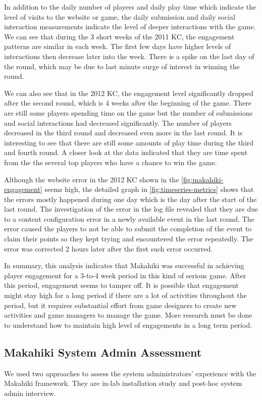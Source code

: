 In addition to the daily number of players and daily play time which indicate the level of visits to the website or game, the daily submission and daily social interaction measurements indicate the level of deeper interactions with the game. We can see that during the 3 short weeks of the 2011 KC, the engagement patterns are similar in each week. The first few days have higher levels of interactions then decrease later into the week. There is a spike on the last day of the round, which may be due to last minute surge of interest in winning the round. 

We can also see that in the 2012 KC, the engagement level significantly dropped after the second round, which is 4 weeks after the beginning of the game. There are still some players spending time on the game but the number of submissions and social interactions had decreased significantly. The number of players decreased in the third round and decreased even more in the last round. It is interesting to see that there are still some amounts of play time during the third and fourth round. A closer look at the data indicated that they are time spent from the the several top players who have a chance to win the game. 

Although the website error in the 2012 KC shown in the  \autoref{fig:makahiki-engagement} seems high, the detailed graph in \autoref{fig:timeseries-metrics} shows that the errors mostly happened during one day which is the day after the start of the last round. The investigation of the error in the log file revealed that they are due to a content configuration error in a newly available event in the last round. The error caused the players to not be able to submit the completion of the event to claim their points so they kept trying and encountered the error repeatedly. The error was corrected 2 hours later after the first such error occurred.

In summary, this analysis indicates that Makahiki was successful in achieving player engagement for a 3-to-4 week period in this kind of serious game. After this period, engagement seems to tamper off. It is possible that engagement might stay high for a long period if there are a lot of activities throughout the period, but it requires substantial effort from game designers to create new activities and game managers to manage the game. More research must be done to understand how to maintain high level of engagements in a long term period.

\subsection{Makahiki System Admin Assessment}
We used two approaches to assess the system administrators' experience with the Makahiki framework. They are in-lab installation study and post-hoc system admin interview.

